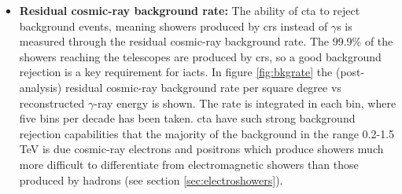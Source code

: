 \documentclass[main.tex]{subfiles}
\begin{document}
\begin{itemize}
\item \textbf{Residual cosmic-ray background rate:} The ability of \gls{cta} to reject background events, meaning showers produced by \glspl{cr} instead of $\gamma$s is measured through the residual cosmic-ray background rate. The 99.9\% of the showers reaching the telescopes are produced by \glspl{cr}, so a good background rejection is a key requirement for \glspl{iact}. In figure \ref{fig:bkgrate} the (post-analysis) residual cosmic-ray background rate per square degree vs reconstructed $\gamma$-ray energy is shown. The rate is integrated in each bin, where five bins per decade has been taken. \gls{cta} have such strong background rejection capabilities that the majority of the background in the range 0.2-1.5 TeV is due cosmic-ray electrons and positrons \cite{2017ICRCCTAPerformance} which produce showers much more difficult to differentiate from electromagnetic showers than those produced by hadrons (see section \ref{sec:electroshowers}).\\


\end{itemize}
\end{document}
